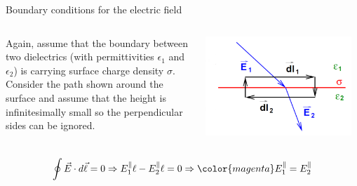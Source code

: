 %
%
%

\begin{frame}{Boundary conditions for the electric field}

\begin{columns}
  \begin{column}{0.50\textwidth}
   {\small
     Again, assume that the boundary between two dielectrics (with
     permittivities $\epsilon_1$ and  $\epsilon_2$)
     is carrying surface charge density $\sigma$.\\
     Consider the path shown around the surface and
     assume that the height is infinitesimally small so the perpendicular
     sides can be ignored.
  }
  \end{column}
  \begin{column}{0.50\textwidth}
    \begin{center}
      \includegraphics[width=0.95\textwidth]{./images/schematics/boundary_conditions_electric_field_2.png}\\
    \end{center}
  \end{column}
\end{columns}

\begin{equation*}
  \oint \vec{E} \cdot d\vec{\ell} = 0 \Rightarrow
       E_1^{\parallel} \ell - E_2^{\parallel} \ell = 0 \Rightarrow
         {\color{magenta} E_1^{\parallel} = E_2^{\parallel}}
\end{equation*}

\end{frame}

%
%
%

